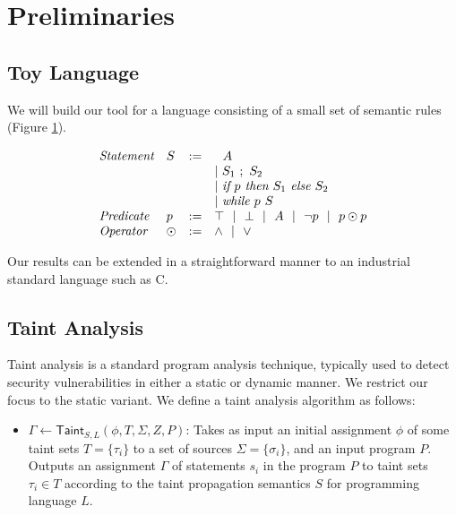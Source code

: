 \documentclass[letterpaper,twocolumn,10pt]{article}
\begin{document}
\section{Preliminaries}

\subsection{Toy Language}

We will build our tool for a language consisting of a small set of semantic rules (Figure \ref{fig:semrules}).

\begin{figure}
\label{fig:semrules}
\caption{}
\[
	\begin{array}{l l c l}
		\emph{Statement} & S & := & 
			\ \ A \\
			& & & |~ S_1\ ;\ S_2 \\
			& & & |~ \emph{if }p\emph{ then } S_1 \emph{ else } S_2 \\
			& & & |~ \emph{while }p\emph{ } S \\
		\emph{Predicate} & p &:=& \top ~~|~~ \bot ~~|~~ A ~~|~~ \lnot p ~~|~~ p \odot p \\
		\emph{Operator} & \odot &:=& \land ~~|~~ \lor \\
	\end{array}
\]
\end{figure}

Our results can be extended in a straightforward manner to an industrial standard language such as C.

\subsection{Taint Analysis}

Taint analysis is a standard program analysis technique, typically used to detect security vulnerabilities in either a static or dynamic manner. 
We restrict our focus to the static variant. We define a taint analysis algorithm as follows:

\begin{itemize}
    \item $\Gamma \gets \mathsf{Taint}_{S,L}(\phi, T, \Sigma, Z, P)$: Takes as input an initial assignment $\phi$ of some taint sets $T = \{\tau_i\}$ to 
    a set of sources $\Sigma = \{\sigma_i\}$, and an input program $P$. Outputs an 
    assignment $\Gamma$ of statements $s_i$ in the program $P$ to taint sets $\tau_i \in T$ according to the taint propagation semantics $S$ for programming
    language $L$.
\end{itemize}
\end{document}
